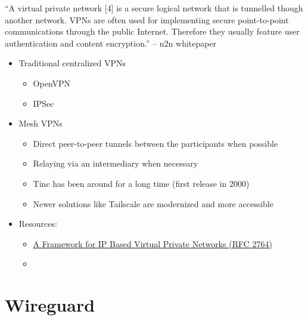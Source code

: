``A virtual private network {[}4{]} is a secure logical network that is
tunnelled though another network. VPNs are often used for implementing
secure point-to-point communications through the public Internet.
Therefore they usually feature user authentication and content
encryption.'' -- n2n whitepaper

\begin{itemize}
\item
  Traditional centralized VPNs

  \begin{itemize}
  \tightlist
  \item
    OpenVPN
  \item
    IPSec
  \end{itemize}
\item
  Mesh VPNs

  \begin{itemize}
  \tightlist
  \item
    Direct peer-to-peer tunnels between the participants when possible
  \item
    Relaying via an intermediary when necessary
  \item
    Tinc has been around for a long time (first release in 2000)
  \item
    Newer solutions like Tailscale are modernized and more accessible
  \end{itemize}
\item
  Resources:

  \begin{itemize}
  \tightlist
  \item
    \href{https://www.rfc-editor.org/rfc/rfc2764.html}{A Framework for
    IP Based Virtual Private Networks (RFC 2764)}
  \item
  \end{itemize}
\end{itemize}

\hypertarget{notes__02051-wireguard.md}{}
\hypertarget{notes__02051-wireguard.md__wireguard}{%
\section{Wireguard}\label{notes__02051-wireguard.md__wireguard}}

